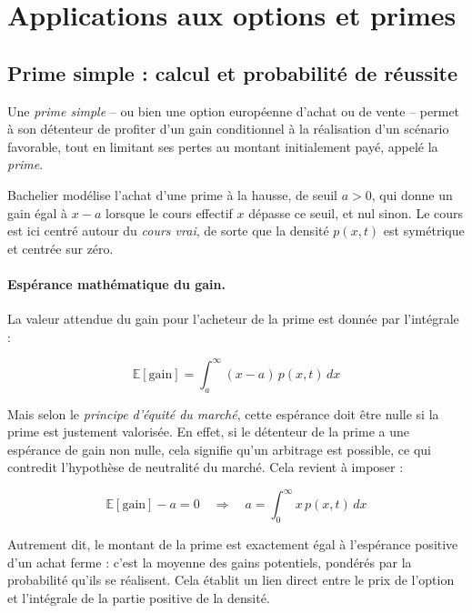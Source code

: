 \documentclass[12pt,a4paper]{article}
\begin{document}
\section{Applications aux options et primes} %

\subsection{Prime simple : calcul et probabilité de réussite}

Une \textit{prime simple} -- ou bien une option européenne d'achat ou de vente -- permet à son détenteur de profiter d’un gain conditionnel à la réalisation d’un scénario favorable, tout en limitant ses pertes au montant initialement payé, appelé la \textit{prime}. 

Bachelier modélise l'achat d'une prime à la hausse, de seuil \( a > 0 \), qui donne un gain égal à \( x - a \) lorsque le cours effectif \( x \) dépasse ce seuil, et nul sinon. Le cours est ici centré autour du \textit{cours vrai}, de sorte que la densité \( p(x,t) \) est symétrique et centrée sur zéro.

\paragraph{Espérance mathématique du gain.}

La valeur attendue du gain pour l’acheteur de la prime est donnée par l'intégrale :

\[
\mathbb{E}[\text{gain}] = \int_a^{\infty} (x - a)\, p(x,t)\, dx
\]

Mais selon le \textit{principe d’équité du marché}, cette espérance doit être nulle si la prime est justement valorisée. En effet, si le détenteur de la prime a une espérance de gain non nulle, cela signifie qu’un arbitrage est possible, ce qui contredit l'hypothèse de neutralité du marché. Cela revient à imposer :

\[
\mathbb{E}[\text{gain}] - a = 0 \quad \Rightarrow \quad a = \int_0^{\infty} x\, p(x,t)\, dx
\]

Autrement dit, le montant de la prime est exactement égal à l’espérance positive d’un achat ferme : c’est la moyenne des gains potentiels, pondérés par la probabilité qu’ils se réalisent. Cela établit un lien direct entre le prix de l’option et l’intégrale de la partie positive de la densité.
\end{document}
